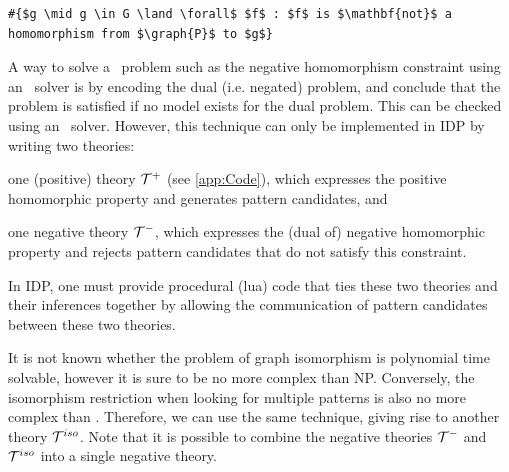 \vspace{-0.5em}
\begin{center}
\begin{minipage}{0.62\linewidth}
\begin{lstlisting}[mathescape, caption=Quantifying over functions outside the vocabulary, label=lst:universalquant]
#{$g \mid g \in G \land \forall$ $f$ : $f$ is $\mathbf{not}$ a homomorphism from $\graph{P}$ to $g$}
\end{lstlisting}
\end{minipage}
\end{center}
\vspace{-0.5em}

A way to solve a \coNP\ problem such as the negative homomorphism constraint using an \NP\ solver is by encoding the dual (i.e. negated) problem, and conclude that the problem is satisfied if no model exists for the dual problem.
This can be checked using an \NP\ solver.
However, this technique can only be implemented in IDP by writing two theories: 
\begin{compactitem}
\item one (positive) theory $\mathcal{T}^{+}$ (see \ref{app:Code}), which expresses the positive homomorphic property and generates pattern candidates, and
\item one negative theory $\mathcal{T}^{-}$, which expresses the (dual of) negative homomorphic property and rejects pattern candidates that do not satisfy this constraint.
\end{compactitem}
In IDP, one must provide procedural (lua) code that ties these two theories and their inferences together by allowing the communication of pattern candidates between these two theories.

It is not known whether the problem of graph isomorphism is polynomial time solvable,
however it is sure to be no more complex than NP.
Conversely, the isomorphism restriction when looking for multiple patterns is also no more complex than \coNP.
Therefore, we can use the same technique, giving rise to another theory $\mathcal{T}^{iso}$.
Note that it is possible to combine the negative theories $\mathcal{T}^{-}$ and $\mathcal{T}^{iso}$ into a single negative theory.



